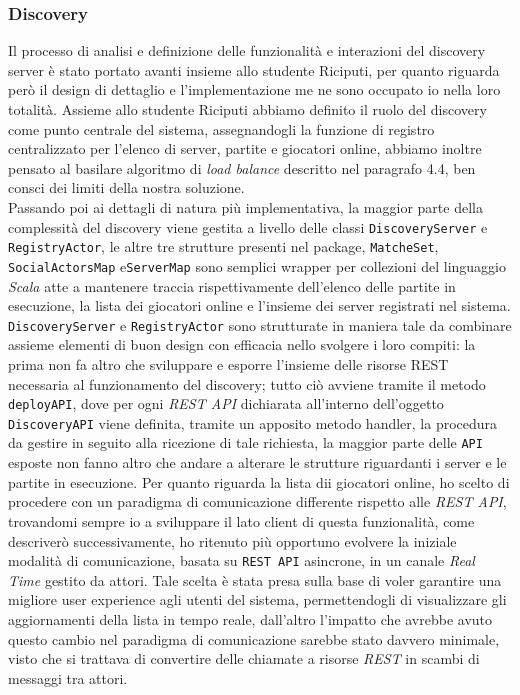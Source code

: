 \subsubsection{Discovery}
Il processo di analisi e definizione delle funzionalità e interazioni del discovery server è stato portato avanti insieme allo studente Riciputi, per quanto riguarda però il design di dettaglio e l'implementazione me ne sono occupato io nella loro totalità.
Assieme allo studente Riciputi abbiamo definito il ruolo del discovery come punto centrale del sistema, assegnandogli la funzione di registro centralizzato per l'elenco di server, partite e giocatori online, abbiamo inoltre pensato al basilare algoritmo di \textit{load balance} descritto nel paragrafo 4.4, ben consci dei limiti della nostra soluzione.\\
Passando poi ai dettagli di natura più implementativa, la maggior parte della complessità del discovery viene gestita a livello delle classi \texttt{DiscoveryServer} e \texttt{RegistryActor}, le altre tre strutture presenti nel package, \texttt{MatcheSet}, \texttt{SocialActorsMap} e\texttt{ServerMap} sono semplici wrapper per collezioni del linguaggio \textit{Scala} atte a mantenere traccia rispettivamente dell'elenco delle partite in esecuzione, la lista dei giocatori online e l'insieme dei server registrati nel sistema.
\texttt{DiscoveryServer} e \texttt{RegistryActor} sono strutturate in maniera tale da combinare assieme elementi di buon design con efficacia nello svolgere i loro compiti: la prima non fa altro che sviluppare e esporre l'insieme delle risorse REST necessaria al funzionamento del discovery; tutto ciò avviene tramite il metodo \texttt{deployAPI}, dove per ogni \textit{REST API} dichiarata all'interno dell'oggetto \texttt{DiscoveryAPI} viene definita, tramite un apposito metodo handler, la procedura da gestire in seguito alla ricezione di tale richiesta, la maggior parte delle \texttt{API} esposte non fanno altro che andare a alterare le strutture riguardanti i server e le partite in esecuzione.
Per quanto riguarda la lista dii giocatori online, ho scelto di procedere con un paradigma di comunicazione differente rispetto alle \textit{REST API}, trovandomi sempre io a sviluppare il lato client di questa funzionalità, come descriverò successivamente, ho ritenuto più opportuno evolvere la iniziale modalità di comunicazione, basata su \texttt{REST API} asincrone, in un canale \textit{Real Time} gestito da attori. Tale scelta è stata presa sulla base di voler garantire una migliore user experience agli utenti del sistema, permettendogli di visualizzare gli aggiornamenti della lista in tempo reale, dall'altro l'impatto che avrebbe avuto questo cambio nel paradigma di comunicazione sarebbe stato davvero minimale, visto che si trattava di convertire delle chiamate a risorse \textit{REST} in scambi di messaggi tra attori.\\
